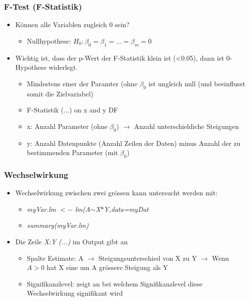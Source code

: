 \subsubsection{F-Test (F-Statistik)}
\begin{itemize}
	\item Können alle Variablen zugleich 0 sein?
	\begin{itemize}
		\item Nullhypothese: $H_0: \beta_0 = \beta_1 =\ldots=\beta_m=0$
	\end{itemize}
	\item Wichtig ist, dass der p-Wert der F-Statistik klein ist (<0.05), dann ist 0-Hypothese widerlegt.
	\begin{itemize}
		\item Mindestens einer der Paramter (ohne $\beta_0$ ist ungleich null (und beeinflusst somit die Zielvariabel)
	\end{itemize}
	\begin{itemize}
		\item F-Statistik (...) on x and y DF
		\item x: Anzahl Parameter (ohne $\beta_0$) $\rightarrow$ Anzahl unterschieldiche Steigungen
		\item y: Anzahl Datenpunkte (Anzahl Zeilen der Daten) minus Anzahl der zu bestimmenden Parameter (mit $\beta_0$)
	\end{itemize}
\end{itemize}

\subsubsection{Wechselwirkung}
\begin{itemize}
	\item Wechselwirkung zwischen zwei grössen kann untersucht werden mit:
	\begin{itemize}
		\item \textit{myVar.lm $<-$ lm(A$\sim$X$\ast$Y,data=myDat}
		\item [] \textit{summary(myVar.lm)}
	\end{itemize}
	\item Die Zeile \textit{X:Y (...)} im Output gibt an
	\begin{itemize}
		\item Spalte Estimate: A $\rightarrow$ Steigungsunterschied von X zu Y $\rightarrow$ Wenn $A>0$ hat X eine um A grössere Steigung als Y
		\item Signifikanzlevel: zeigt an bei welchem Signifikanzlevel diese Wechselwirkung signifikant wird
	\end{itemize}
\end{itemize}


